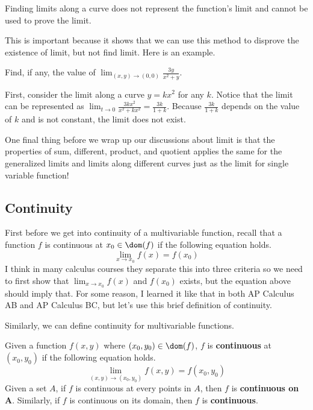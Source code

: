\documentclass[../../../main.tex]{subfiles}
\begin{document}
\begin{important}
Finding limits along a curve does not represent the function's limit
and cannot be used to prove the limit.
\end{important}

This is important because it shows that we can use this method to
disprove the existence of limit, but not find limit. Here is an
example.

\begin{problem}{}{}
Find, if any, the value of $\lim_{(x, y) \to (0, 0)}
\frac{3y}{x^2 + y}$.
\end{problem}
\begin{solution}
First, consider the limit along a curve $y = kx^2$ for any $k$.
Notice that the limit can be represented as $\lim_{t \to 0}
\frac{3kx^2}{x^2 + kx^2} = \frac{3k}{1 + k}$. Because
$\frac{3k}{1 + k}$ depends on the value of $k$ and is not constant,
the limit does not exist.
\end{solution}

One final thing before we wrap up our discussions about limit is that
the properties of sum, different, product, and quotient applies the
same for the generalized limits and limits along different curves
just as the limit for single variable function!

\subsection{Continuity}

First before we get into continuity of a multivariable function,
recall that a function $f$ is continuous at $x_0 \in \dom(f)$ if the
following equation holds.
\[
\lim_{x \to x_0} f(x) = f(x_0)
\]
I think in many calculus courses they separate this into three
criteria so we need to first show that $\lim_{x \to x_0} f(x)$
and $f(x_0)$ exists, but the equation above should imply that.
For some reason, I learned it like that in both AP Calculus AB and
AP Calculus BC, but let's use this brief definition of continuity.

Similarly, we can define continuity for multivariable functions.

\begin{definition}{}{}
Given a function $f(x, y)$ where $(x_0, y_0) \in \dom(f)$, $f$ is
\textbf{continuous} at $(x_0, y_0)$ if the following equation holds.
\vspace{-0.5\baselineskip}
\[
\lim_{(x, y) \to (x_0, y_0)} f(x, y) = f(x_0, y_0)
\]
Given a set $A$, if $f$ is continuous at every points in $A$,
then $f$ is \textbf{continuous on $\mathbf{A}$}. Similarly,
if $f$ is continuous on its domain, then $f$ is \textbf{continuous}.
\end{definition}
\end{document}
